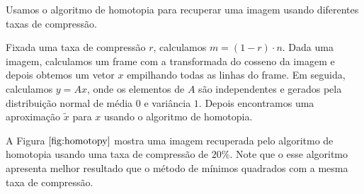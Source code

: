 Usamos o algoritmo de homotopia para recuperar uma imagem usando diferentes taxas de compressão.

Fixada uma taxa de compressão $r$, calculamos $m = (1 - r) \cdot n$. Dada uma imagem, calculamos um frame com a transformada do cosseno da imagem e depois obtemos um vetor $x$ empilhando todas as linhas do frame. Em seguida, calculamos $y = Ax$, onde os elementos de $A$ são independentes e gerados pela distribuição normal de média $0$ e variância $1$. Depois encontramos uma aproximação $\tilde{x}$ para $x$ usando o algoritmo de homotopia.

A Figura $\ref{fig:homotopy}$ mostra uma imagem recuperada pelo algoritmo de homotopia usando uma taxa de compressão de $20\%$. Note que o esse algoritmo apresenta melhor resultado que o método de mínimos quadrados com a mesma taxa de compressão.
